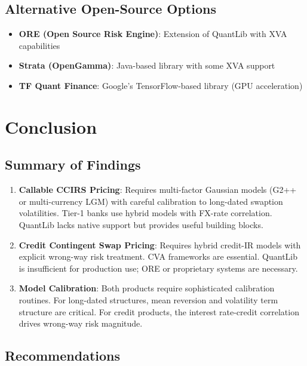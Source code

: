 \documentclass[conference]{IEEEtran}
\theoremstyle{definition}
\begin{document}
\subsection{Alternative Open-Source Options}

\begin{itemize}
    \item \textbf{ORE (Open Source Risk Engine)}: Extension of QuantLib with XVA capabilities
    \item \textbf{Strata (OpenGamma)}: Java-based library with some XVA support
    \item \textbf{TF Quant Finance}: Google's TensorFlow-based library (GPU acceleration)
\end{itemize}

\section{Conclusion}

\subsection{Summary of Findings}

\begin{enumerate}
    \item \textbf{Callable CCIRS Pricing}: Requires multi-factor Gaussian models (G2++ or multi-currency LGM) with careful calibration to long-dated swaption volatilities. Tier-1 banks use hybrid models with FX-rate correlation. QuantLib lacks native support but provides useful building blocks.

    \item \textbf{Credit Contingent Swap Pricing}: Requires hybrid credit-IR models with explicit wrong-way risk treatment. CVA frameworks are essential. QuantLib is insufficient for production use; ORE or proprietary systems are necessary.

    \item \textbf{Model Calibration}: Both products require sophisticated calibration routines. For long-dated structures, mean reversion and volatility term structure are critical. For credit products, the interest rate-credit correlation drives wrong-way risk magnitude.
\end{enumerate}

\subsection{Recommendations}
\end{document}
